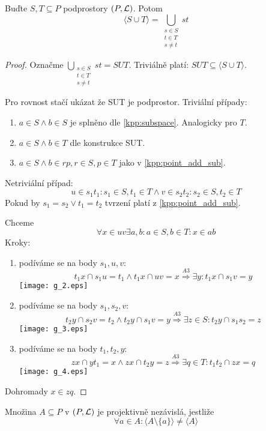 \begin{lemma}\label{kpp:sub_join}
    Buďte $S,T \subseteq P$ podprostory $(P, \operatorname{\mathcal{L}})$.
    Potom
    \[ \langle S \cup T \rangle = \bigcup_{\substack{ s\in S \\ t\in T \\ s\neq t}} st \]
\end{lemma}
\begin{proof}
	Označme $\bigcup_{\substack{ s\in S \\ t\in T \\ s\neq t}} st = SUT$.
	Triviálně platí: $SUT \subseteq \langle S \cup T \rangle$.

	Pro rovnost stačí ukázat že SUT je podprostor.
	Triviální případy:
	\begin{enumerate}
		\item $a \in S \land b \in S$ je splněno dle \cref{kpp:subspace}.
			Analogicky pro $T$.
		\item $a \in S \land b \in T$ dle konstrukce SUT.
		\item $a \in S \land b \in rp, r \in S, p \in T$ jako v \cref{kpp:point_add_sub}.
	\end{enumerate}

	Netriviální případ:
	\[ u \in s_1t_1: s_1 \in S, t_1 \in T \land v \in s_2t_2: s_2 \in S, t_2 \in T \]
	Pokud by $s_1 = s_2 \lor t_1 = t_2$ tvrzení platí z \cref{kpp:point_add_sub}.

	Chceme
	\[ \forall x \in uv \exists a, b: a \in S, b \in T: x \in ab \]
	Kroky:
	\begin{enumerate}
		\item podíváme se na body $s_1, u, v$:
			\[ t_1x \cap s_1u = t_1 \land t_1x \cap uv = x \stackrel{A3}{\Rightarrow} \exists y: t_1x \cap s_1v = y \]
		\texttt{[image: g\_2.eps]}
	\item podíváme se na body $s_1, s_2, v$:
		\[ t_2y \cap s_2v = t_2 \land t_2y \cap s_1v = y \stackrel{A3}{\Rightarrow} \exists z \in S: t_2y \cap s_1s_2 = z \]
		\texttt{[image: g\_3.eps]}

	\item podíváme se na body $t_1, t_2, y$:
		\[ zx \cap yt_1 = x \land zx \cap t_2y = z \stackrel{A3}{\Rightarrow} \exists q \in T: t_1t_2 \cap zx = q \]
		\texttt{[image: g\_4.eps]}
	\end{enumerate}
	Dohromady $x \in zq$.
\end{proof}

\begin{definition}
    Množina $A\subseteq P$ v $(P,\operatorname{\mathcal{L}})$ je projektivně nezávislá, jestliže
    \[ \forall a\in A: \langle A\setminus \{a\}\rangle\neq\langle A \rangle \]
\end{definition}

